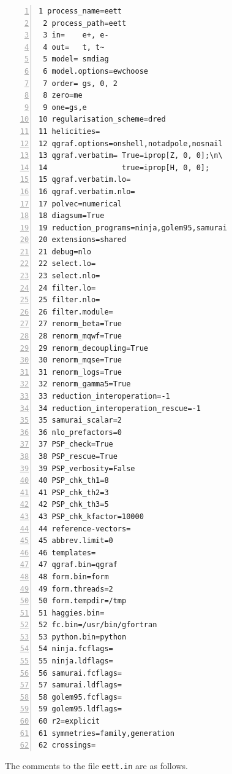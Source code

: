 \documentclass[11pt,a4paper]{refrep}
\begin{document}
\begin{lstlisting}[gobble=3,%
     numbers=left,caption={{\tt eett.in}},%
     basicstyle=\ttfamily]
 1 process_name=eett
 2 process_path=eett
 3 in=    e+, e-
 4 out=   t, t~
 5 model= smdiag
 6 model.options=ewchoose
 7 order= gs, 0, 2
 8 zero=me
 9 one=gs,e
10 regularisation_scheme=dred
11 helicities=
12 qgraf.options=onshell,notadpole,nosnail
13 qgraf.verbatim= True=iprop[Z, 0, 0];\n\
14                 true=iprop[H, 0, 0];
15 qgraf.verbatim.lo=
16 qgraf.verbatim.nlo=
17 polvec=numerical
18 diagsum=True
19 reduction_programs=ninja,golem95,samurai
20 extensions=shared
21 debug=nlo
22 select.lo=
23 select.nlo=
24 filter.lo=
25 filter.nlo=
26 filter.module=
27 renorm_beta=True
28 renorm_mqwf=True
29 renorm_decoupling=True
30 renorm_mqse=True
31 renorm_logs=True
32 renorm_gamma5=True
33 reduction_interoperation=-1
34 reduction_interoperation_rescue=-1
35 samurai_scalar=2
36 nlo_prefactors=0
37 PSP_check=True
38 PSP_rescue=True
39 PSP_verbosity=False
40 PSP_chk_th1=8
41 PSP_chk_th2=3
42 PSP_chk_th3=5
43 PSP_chk_kfactor=10000
44 reference-vectors=
45 abbrev.limit=0
46 templates=
47 qgraf.bin=qgraf
48 form.bin=form
49 form.threads=2
50 form.tempdir=/tmp
51 haggies.bin=
52 fc.bin=/usr/bin/gfortran
53 python.bin=python
54 ninja.fcflags=
55 ninja.ldflags=
56 samurai.fcflags=
57 samurai.ldflags=
58 golem95.fcflags=
59 golem95.ldflags=
60 r2=explicit
61 symmetries=family,generation
62 crossings=
\end{lstlisting}

The comments to the file {\tt eett.in} are as follows. 
\end{document}
